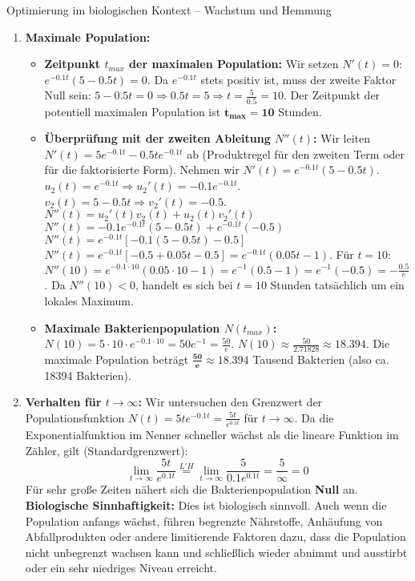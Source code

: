 \begin{loesungsumgebung}{Optimierung im biologischen Kontext – Wachstum und Hemmung}
\begin{enumerate}[label=(\alph*)]
    \item \textbf{Maximale Population:}
    \begin{itemize}
        \item \textbf{Zeitpunkt $t_{max}$ der maximalen Population:}
        Wir setzen $N'(t)=0$: $e^{-0.1t}(5 - 0.5t) = 0$.
        Da $e^{-0.1t}$ stets positiv ist, muss der zweite Faktor Null sein:
        $5 - 0.5t = 0 \Rightarrow 0.5t = 5 \Rightarrow t = \frac{5}{0.5} = 10$.
        Der Zeitpunkt der potentiell maximalen Population ist $\mathbf{t_{max} = 10}$ Stunden.
        \item \textbf{Überprüfung mit der zweiten Ableitung $N''(t)$:}
        Wir leiten $N'(t) = 5e^{-0.1t} - 0.5te^{-0.1t}$ ab (Produktregel für den zweiten Term oder für die faktorisierte Form).
        Nehmen wir $N'(t) = e^{-0.1t}(5 - 0.5t)$.
        $u_2(t)=e^{-0.1t} \Rightarrow u_2'(t)=-0.1e^{-0.1t}$.
        $v_2(t)=5-0.5t \Rightarrow v_2'(t)=-0.5$.
        $N''(t) = u_2'(t)v_2(t) + u_2(t)v_2'(t)$
        $N''(t) = -0.1e^{-0.1t}(5 - 0.5t) + e^{-0.1t}(-0.5)$
        $N''(t) = e^{-0.1t}[-0.1(5 - 0.5t) - 0.5]$
        $N''(t) = e^{-0.1t}[-0.5 + 0.05t - 0.5] = e^{-0.1t}(0.05t - 1)$.
        Für $t=10$:
        $N''(10) = e^{-0.1 \cdot 10}(0.05 \cdot 10 - 1) = e^{-1}(0.5 - 1) = e^{-1}(-0.5) = -\frac{0.5}{e}$.
        Da $N''(10) < 0$, handelt es sich bei $t=10$ Stunden tatsächlich um ein lokales Maximum.
        \item \textbf{Maximale Bakterienpopulation $N(t_{max})$:}
        $N(10) = 5 \cdot 10 \cdot e^{-0.1 \cdot 10} = 50e^{-1} = \frac{50}{e}$.
        $N(10) \approx \frac{50}{2.71828} \approx 18.394$.
        Die maximale Population beträgt $\mathbf{\frac{50}{e} \approx 18.394}$ Tausend Bakterien (also ca. 18394 Bakterien).
    \end{itemize}

    \item \textbf{Verhalten für $t \to \infty$:}
    Wir untersuchen den Grenzwert der Populationsfunktion $N(t) = 5t e^{-0.1t} = \frac{5t}{e^{0.1t}}$ für $t \to \infty$.
    Da die Exponentialfunktion im Nenner schneller wächst als die lineare Funktion im Zähler, gilt (Standardgrenzwert):
    $$ \lim_{t \to \infty} \frac{5t}{e^{0.1t}} \stackrel{L'H}{=} \lim_{t \to \infty} \frac{5}{0.1e^{0.1t}} = \frac{5}{\infty} = 0 $$
    Für sehr große Zeiten nähert sich die Bakterienpopulation \textbf{Null} an.
    \textbf{Biologische Sinnhaftigkeit:} Dies ist biologisch sinnvoll. Auch wenn die Population anfangs wächst, führen begrenzte Nährstoffe, Anhäufung von Abfallprodukten oder andere limitierende Faktoren dazu, dass die Population nicht unbegrenzt wachsen kann und schließlich wieder abnimmt und ausstirbt oder ein sehr niedriges Niveau erreicht.


\end{enumerate}
\end{loesungsumgebung}
